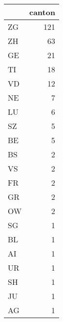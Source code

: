 \begin{tabular}{lr}
\toprule
{} &  canton \\
\midrule
ZG &     121 \\
ZH &      63 \\
GE &      21 \\
TI &      18 \\
VD &      12 \\
NE &       7 \\
LU &       6 \\
SZ &       5 \\
BE &       5 \\
BS &       2 \\
VS &       2 \\
FR &       2 \\
GR &       2 \\
OW &       2 \\
SG &       1 \\
BL &       1 \\
AI &       1 \\
UR &       1 \\
SH &       1 \\
JU &       1 \\
AG &       1 \\
\bottomrule
\end{tabular}
